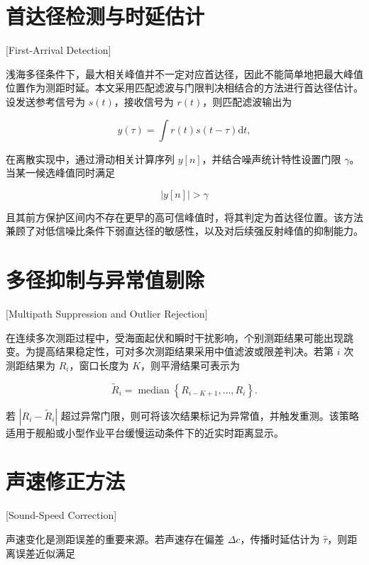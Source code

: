 \section{首达径检测与时延估计}[First-Arrival Detection]

浅海多径条件下，最大相关峰值并不一定对应首达径，因此不能简单地把最大峰值位置作为测距时延。本文采用匹配滤波与门限判决相结合的方法进行首达径估计。设发送参考信号为 $s(t)$，接收信号为 $r(t)$，则匹配滤波输出为

\begin{equation}
  y(\tau) = \int r(t)s(t-\tau)\mathrm{d}t,
  \label{eq:mf_output}
\end{equation}

在离散实现中，通过滑动相关计算序列 $y[n]$，并结合噪声统计特性设置门限 $\gamma$。当某一候选峰值同时满足

\begin{equation}
  |y[n]| > \gamma
\end{equation}

且其前方保护区间内不存在更早的高可信峰值时，将其判定为首达径位置。该方法兼顾了对低信噪比条件下弱直达径的敏感性，以及对后续强反射峰值的抑制能力\cite{HaoMengHuaJiYuQianHaiDuoJingShiYanDeFuHeMaShuiShengCeJuYanJiu2020}。

\section{多径抑制与异常值剔除}[Multipath Suppression and Outlier Rejection]

在连续多次测距过程中，受海面起伏和瞬时干扰影响，个别测距结果可能出现跳变。为提高结果稳定性，可对多次测距结果采用中值滤波或限差判决。若第 $i$ 次测距结果为 $R_i$，窗口长度为 $K$，则平滑结果可表示为

\begin{equation}
  \tilde{R}_i = \operatorname{median}\left\{R_{i-K+1}, \ldots, R_i\right\}.
\end{equation}

若 $|R_i - \tilde{R}_i|$ 超过异常门限，则可将该次结果标记为异常值，并触发重测。该策略适用于舰船或小型作业平台缓慢运动条件下的近实时距离显示。

\section{声速修正方法}[Sound-Speed Correction]

声速变化是测距误差的重要来源。若声速存在偏差 $\Delta c$，传播时延估计为 $\hat{\tau}$，则距离误差近似满足

